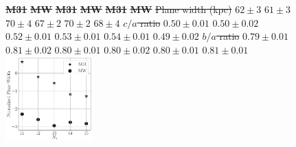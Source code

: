 \documentclass[a4paper,fleqn,usenatbib]{mnras}
\providecommand{\DIFdeltex}[1]{{\protect\color{red}\sout{#1}}}                      %
\providecommand{\DIFdelFL}[1]{\DIFdel{#1}} %
\providecommand{\DIFaddbeginFL}{} %
\providecommand{\DIFdelendFL}{} %
\providecommand{\DIFdel}[1]{\texorpdfstring{\DIFdeltex{#1}}{}} %
\newcommand{\DIFaddincludegraphics}[2][]{{\color{blue}\fbox{\DIFOincludegraphics[#1]{#2}}}} %
\DeclareRobustCommand{\DIFaddbeginFL}{\DIFOaddbeginFL \let\includegraphics\DIFaddincludegraphics} %
\DeclareRobustCommand{\DIFdelendFL}{\DIFOaddendFL \let\includegraphics\DIFOincludegraphics} %
\begin{document}
\begin{figure}
\textbf{\DIFdelFL{M31}} %
\textbf{\DIFdelFL{MW}} %
\textbf{\DIFdelFL{M31}} %
\textbf{\DIFdelFL{MW}}%
\textbf{\DIFdelFL{M31}} %
\textbf{\DIFdelFL{MW}}%
\DIFdelFL{Plane width (kpc) }%
\DIFdelFL{$62\pm 3$   }%
\DIFdelFL{$61\pm 3$     }%
\DIFdelFL{$70\pm 4$ }%
\DIFdelFL{$67\pm 2$ }%
\DIFdelFL{$70\pm 2$}%
\DIFdelFL{$68\pm 4$ }%
\DIFdelFL{$c/a$ ratio }%
\DIFdelFL{$0.50\pm0.01$ }%
\DIFdelFL{$0.50\pm 0.02$ }%
\DIFdelFL{$0.52\pm 0.01$ }%
\DIFdelFL{$0.53\pm 0.01$ }%
\DIFdelFL{$0.54\pm 0.01$}%
\DIFdelFL{$0.49\pm 0.02$ }%
\DIFdelFL{$b/a$ ratio }%
\DIFdelFL{$0.79\pm0.01$ }%
\DIFdelFL{$0.81\pm 0.02$ }%
\DIFdelFL{$0.80\pm 0.01$ }%
\DIFdelFL{$0.80\pm 0.02$ }%
\DIFdelFL{$0.80\pm0.01$}%
\DIFdelFL{$0.81\pm 0.01$}%
\DIFdelendFL \DIFaddbeginFL \includegraphics[width=0.30\textwidth]{normalized_width_n_dependence.pdf}

\end{figure}
\end{document}
